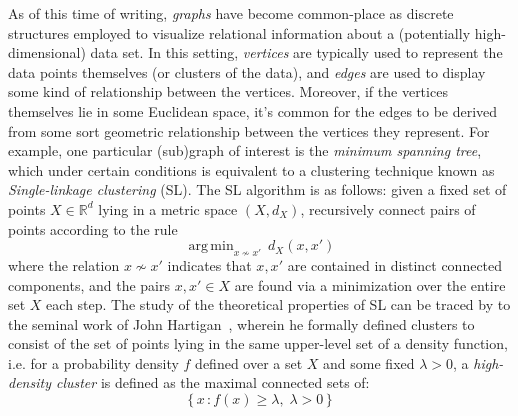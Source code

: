 \documentclass{vgtc}                          %
\DeclareMathOperator*{\argmin}{arg\,min}
\begin{document}
As of this time of writing, \emph{graphs} have become common-place as discrete structures employed to visualize relational information about a (potentially high-dimensional) data set. In this setting, \emph{vertices} are typically used to represent the data points themselves (or clusters of the data), and \emph{edges} are used to display some kind of relationship between the vertices. Moreover, if the vertices themselves lie in some Euclidean space, it's common for the edges to be derived from some sort geometric relationship between the vertices they represent. For example, one particular (sub)graph of interest is the \emph{minimum spanning tree}, which under certain conditions is equivalent to a clustering technique known as \emph{Single-linkage clustering} (SL). The SL algorithm is as follows: given a fixed set of points $X \in \mathbb{R}^d$ lying in a metric space $(X, d_X)$, recursively connect pairs of points according to the rule
\begin{equation}
    \argmin_{x \nsim x'} \, d_X(x, x') %
\end{equation}
where the relation $x \nsim x'$ indicates that $x, x'$ are contained in distinct connected components, and the pairs $x, x' \in X$ are found via a minimization over the entire set $X$ each step. The study of the theoretical properties of SL can be traced by to the seminal work of John Hartigan~\cite{hartigan1981consistency}, wherein he formally defined clusters to consist of the set of points lying in the same upper-level set of a density function, i.e. for a probability density $f$ defined over a set $X$ and some fixed $\lambda > 0$, a \emph{high-density cluster} is defined as the maximal connected sets of:
\begin{equation}
    \{ \, x \, : f(x) \geq \lambda, \; \lambda > 0 \,\}
\end{equation}
\end{document}
